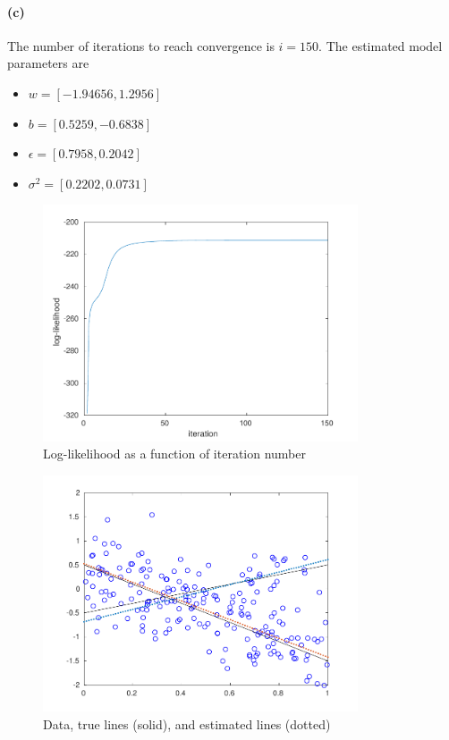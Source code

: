 \documentclass[12pt]{article}
\begin{document}
\paragraph{(c)}
The number of iterations to reach convergence is \(i=150\).
The estimated model parameters are
\begin{itemize}
    \item \(w=[-1.94656, 1.2956]\)
    \item \(b=[0.5259, -0.6838]\)
    \item \(\epsilon=[0.7958, 0.2042]\)
    \item \(\sigma^2=[0.2202, 0.0731]\)
\end{itemize}
\begin{figure}[htbp]
    \centering
    \includegraphics[width=0.83\textwidth]{./hw5/problem3/hw5p3b.pdf}
    \caption{Log-likelihood as a function of iteration number}
\end{figure}
\begin{figure}[htbp]
    \centering
    \includegraphics[width=0.83\textwidth]{./hw5/problem3/hw5p3a.pdf}
    \caption{Data, true lines (solid), and estimated lines (dotted)}
\end{figure}
\inputminted[frame=single,framesep=10pt,linenos,xleftmargin=\parindent]{octave}{./hw5/problem3/mlr.m}
\end{document}

